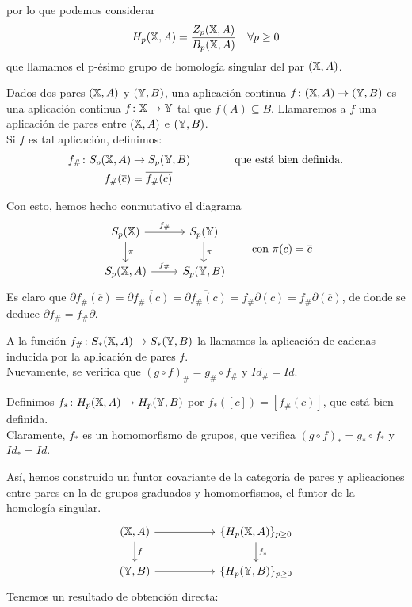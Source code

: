 por lo que podemos considerar
\[H_p({\mathbb X}, A) = \frac{Z_p({\mathbb X}, A)}{B_p({\mathbb X}, A)} \quad \forall p \geq 0 \]
que llamamos el p-ésimo grupo de homología singular del par $({\mathbb X}, A)$.

Dados dos pares $({\mathbb X}, A)$ y $({\mathbb Y}, B)$, una aplicación continua $f \colon ({\mathbb X}, A) \to ({\mathbb Y}, B)$ es una aplicación continua
$f \colon {\mathbb X} \to {\mathbb Y}$ tal que $f(A) \subseteq B$. Llamaremos a $f$ una aplicación de pares entre $({\mathbb X}, A)$ e $({\mathbb Y}, B)$. \\
Si $f$ es tal aplicación, definimos:
\begin{align*}
  f_\# \colon S_p({\mathbb X}, A) &\to S_p({\mathbb Y}, B) \hspace{4em} \text{que está bien definida.} \\
  f_\#(\overline{c}) &= \overline{f_\#(c)}
\end{align*}

Con esto, hemos hecho conmutativo el diagrama
\[
\begin{tikzcd}
    S_p(\X) \arrow{r}{f_\#} \arrow{d}{\pi} & S_p(\Y) \arrow{d}{\pi} \\
    S_p(\X, A) \arrow{r}{f_\#} & S_p(\Y, B)
  \end{tikzcd}
  \hspace{2em} \text{con } \pi(c) = \overline{c}
\]
Es claro que $\partial f_\#(\overline{c}) = \partial \overline{f_\#(c)} = \overline{\partial f_\#(c)} = f_\# \partial(c) = f_\# \partial(\overline{c})$,
de donde se deduce $\partial f_\# = f_\# \partial$.

A la función $f_\# \colon S_*({\mathbb X}, A) \to S_*({\mathbb Y}, B)$ la llamamos la aplicación de cadenas inducida por la aplicación de pares $f$. \\
Nuevamente, se verifica que $(g \circ f)_\# = g_\# \circ f_\#$ y $Id_\# = Id$.

Definimos $f_* \colon H_p({\mathbb X}, A) \to H_p({\mathbb Y}, B)$ por $f_*([\overline{c}]) = [f_\#(\overline{c})]$, que está bien definida. \\
Claramente, $f_*$ es un homomorfismo de grupos, que verifica $(g \circ f)_* = g_* \circ f_*$ y $Id_* = Id$.

Así, hemos construído un funtor covariante de la categoría de pares y aplicaciones entre pares en la de grupos graduados y homomorfismos,
el funtor de la homología singular.
\[
\begin{tikzcd}
  (\X, A) \arrow{r} \arrow{d}{f} & [3em] \{H_p(\X, A)\}_{p \geq 0} \arrow{d}{f_*} \\
  (\Y, B) \arrow{r} & \{H_p(\Y, B)\}_{p \geq 0}
\end{tikzcd}
\]
Tenemos un resultado de obtención directa:


